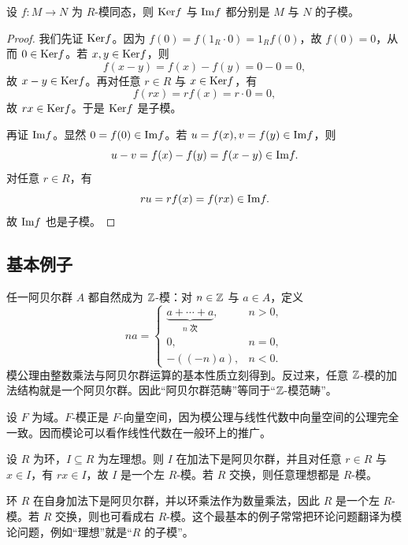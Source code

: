 \begin{proposition}
设 $f\colon M\to N$ 为 $R$-模同态，则 $\mathrm{Ker} f$ 与 $\mathrm{Im} f$ 都分别是 $M$ 与 $N$ 的子模。
\end{proposition}

\begin{proof}
我们先证 $\mathrm{Ker} f$。因为 $f(0)=f(1_R\cdot 0)=1_Rf(0)$，故 $f(0)=0$，从而 $0\in \mathrm{Ker} f$。若 $x,y\in \mathrm{Ker} f$，则
\[
f(x-y)=f(x)-f(y)=0-0=0,
\]
故 $x-y\in \mathrm{Ker} f$。再对任意 $r\in R$ 与 $x\in \mathrm{Ker} f$，有
\[
f(rx)=rf(x)=r\cdot 0=0,
\]
故 $rx\in \mathrm{Ker} f$。于是 $\mathrm{Ker} f$ 是子模。

再证 $\mathrm{Im} f$。显然 $0=f(0)\in \mathrm{Im} f$。若 $u=f(x),v=f(y)\in \mathrm{Im} f$，则
\[
u-v=f(x)-f(y)=f(x-y)\in \mathrm{Im} f.
\]
对任意 $r\in R$，有
\[
ru=rf(x)=f(rx)\in \mathrm{Im} f.
\]
故 $\mathrm{Im} f$ 也是子模。
\end{proof}

\subsection{基本例子}

\begin{example}[阿贝尔群就是 $\Z$-模]
任一阿贝尔群 $A$ 都自然成为 $\Z$-模：对 $n\in \mathbb{Z}$ 与 $a\in A$，定义
\[
na=\begin{cases}
\underbrace{a+\cdots+a}_{n\text{ 次}},&n>0,\\
0,&n=0,\\
-( (-n)a),&n<0.
\end{cases}
\]
模公理由整数乘法与阿贝尔群运算的基本性质立刻得到。反过来，任意 $\Z$-模的加法结构就是一个阿贝尔群。因此“阿贝尔群范畴”等同于“$\Z$-模范畴”。
\end{example}

\begin{example}[向量空间就是域上的模]
设 $F$ 为域。$F$-模正是 $F$-向量空间，因为模公理与线性代数中向量空间的公理完全一致。因而模论可以看作线性代数在一般环上的推广。
\end{example}

\begin{example}[理想是自然的模]
设 $R$ 为环，$I\subseteq R$ 为左理想。则 $I$ 在加法下是阿贝尔群，并且对任意 $r\in R$ 与 $x\in I$，有 $rx\in I$，故 $I$ 是一个左 $R$-模。若 $R$ 交换，则任意理想都是 $R$-模。
\end{example}

\begin{example}[环自身作为模]
环 $R$ 在自身加法下是阿贝尔群，并以环乘法作为数量乘法，因此 $R$ 是一个左 $R$-模。若 $R$ 交换，则也可看成右 $R$-模。这个最基本的例子常常把环论问题翻译为模论问题，例如“理想”就是“$R$ 的子模”。
\end{example}

